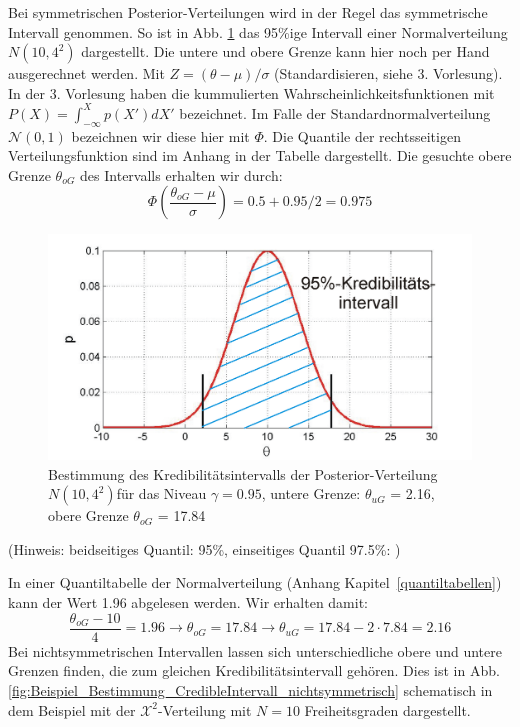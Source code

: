 Bei symmetrischen Posterior-Verteilungen wird in der Regel 
das symmetrische Intervall genommen. So ist in Abb. \ref{fig:Beispiel_Bestimmung_CredibleIntervall}  das 95\%ige Intervall 
einer Normalverteilung $N(10,4^2)$ dargestellt. 
Die untere und obere Grenze kann hier noch per Hand ausgerechnet werden. 
Mit $Z=(\theta - \mu)/ \sigma$ (Standardisieren, siehe 3. Vorlesung).
In der 3. Vorlesung haben die kummulierten Wahrscheinlichkeitsfunktionen mit $P(X) = \int_{-\infty}^{X} p(X') dX'$ bezeichnet. Im Falle der 
Standardnormalverteilung $\mathcal{N}(0,1)$ bezeichnen wir diese hier mit $\Phi$. Die Quantile der rechtsseitigen Verteilungsfunktion sind im Anhang in der Tabelle dargestellt. Die gesuchte obere Grenze $\theta_{oG}$ des Intervalls erhalten wir durch:
\[
\Phi\left(\frac{\theta_{oG}-\mu}{\sigma}\right) = 0.5 + 0.95/2 = 0.975   
\]
\begin{figure}[!htb]
	\begin{center}
		\includegraphics[width=120mm]
		{08_vorlesung/media/Posterior_Vertrauensintervall_all.png}
		\caption{Bestimmung des Kredibilitätsintervalls der Posterior-Verteilung $N(10,4^2)$für das Niveau
			$\gamma = 0.95 $, untere Grenze: $\theta_{uG}$ = 2.16, 
	    	obere Grenze $\theta_{oG}$ = 17.84}
    	\label{fig:Beispiel_Bestimmung_CredibleIntervall} 
	\end{center}
\end{figure}
(Hinweis: beidseitiges Quantil: 95\%, einseitiges Quantil 97.5\%: )

In einer Quantiltabelle der Normalverteilung (Anhang Kapitel~\ref{quantiltabellen}) kann der Wert 1.96 abgelesen werden.
Wir erhalten damit: 
\[
\frac{\theta_{oG}-10}{4} = 1.96 \rightarrow \theta_{oG} = 17.84 
\rightarrow \theta_{uG} = 17.84 - 2 \cdot 7.84 = 2.16
\]
Bei nichtsymmetrischen Intervallen lassen sich unterschiedliche obere und untere Grenzen finden, die zum gleichen Kredibilitätsintervall gehören. Dies ist in 
Abb. \ref{fig:Beispiel_Bestimmung_CredibleIntervall_nichtsymmetrisch}
schematisch in dem Beispiel mit der $\mathcal{X}^2$-Verteilung mit $N=10$ Freiheitsgraden dargestellt.

